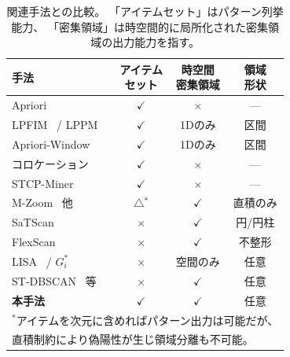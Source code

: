 \begin{table}[t]
\centering
\caption{関連手法との比較。
「アイテムセット」はパターン列挙能力、
「密集領域」は時空間的に局所化された密集領域の出力能力を指す。}
\label{tab:related}
\small
\begin{tabular}{lccc}
\toprule
手法 & \shortstack{アイテム\\セット} & \shortstack{時空間\\密集領域} & \shortstack{領域\\形状} \\
\midrule
Apriori~\cite{agrawal1994apriori}
                                          & $\checkmark$ & $\times$     & ---          \\
LPFIM~\cite{mahanta2005lpfim} / LPPM~\cite{fournierviger2021lppm}
                                          & $\checkmark$ & 1Dのみ      & 区間     \\
Apriori-Window~\cite{aprioriwindow}       & $\checkmark$ & 1Dのみ      & 区間     \\
コロケーション~\cite{shekhar2001colocation}
                                          & $\checkmark$ & $\times$     & ---          \\
STCP-Miner~\cite{qian2009stcolocation}   & $\checkmark$ & $\times$     & ---          \\
\midrule
M-Zoom~\cite{shin2018mzoom} 他           & $\triangle$$^*$     & $\checkmark$ & 直積のみ \\
SaTScan~\cite{kulldorff1997spatial}       & $\times$     & $\checkmark$ & 円/円柱 \\
FlexScan~\cite{tango2005flexscan}        & $\times$     & $\checkmark$ & 不整形    \\
LISA~\cite{anselin1995lisa}
  / $G_i^*$~\cite{ord1995getis}          & $\times$     & 空間のみ     & 任意         \\
ST-DBSCAN~\cite{birant2007stdbscan} 等   & $\times$   & $\checkmark$ & 任意    \\
\midrule
\textbf{本手法}                              & $\checkmark$ & $\checkmark$ & 任意    \\
\bottomrule
\multicolumn{4}{l}{\scriptsize $^*$アイテムを次元に含めればパターン出力は可能だが、} \\
\multicolumn{4}{l}{\scriptsize \hspace{1em}直積制約により偽陽性が生じ領域分離も不可能。}
\end{tabular}
\end{table}
